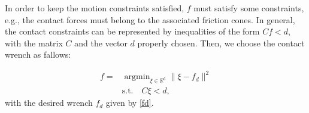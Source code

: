 \documentclass[final,5p,twocolumn]{elsarticle}
\DeclareMathOperator*{\argmin}{argmin}
\begin{document}
 In order to keep the motion constraints satisfied, $f$ must satisfy some constraints, e.g., the contact forces
 must belong to the associated friction cones. In general, the contact constraints can be represented by inequalities of the 
 form $Cf < d$, with the matrix $C$ and the vector $d$ properly chosen. Then, we choose the contact wrench  as fallows:

\begin{subequations} \label{eq:TSID}
\begin{align}
\label{eq:torquesTSID}
  f = & \argmin_{  \xi \in \mathbb{R}^6} \|   \xi -   f_d\|^2 \\
\label{eq:dynTSID}
& \mbox{s.t.}  \quad C\xi < d, 
\end{align}
\end{subequations}
with the desired wrench $f_d$ given by \eqref{fd}.
\end{document}
